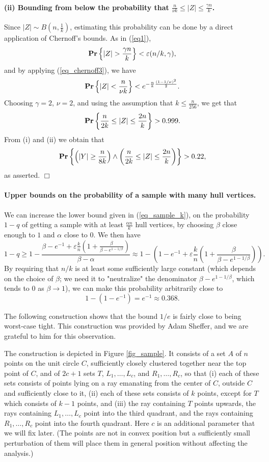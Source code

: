 \documentclass[11pt]{article}
\def\eps{\varepsilon}
\begin{document}
\paragraph{(ii) Bounding from below the probability that $\frac{n}{\nu k} \leq |Z| \leq \frac{\gamma n}{k}$.} Since $|Z| \sim B(n,\frac{1}{k})$, estimating this probability can be done by a direct application of Chernoff's bounds. As in (\ref{eq1}),
$$
{\bf Pr}\left\{|Z| > \frac{\gamma n}{k} \right\} < \eps(n/k,\gamma),
$$
and by applying (\ref{eq_chernoff3}), we have
$$
{\bf Pr}\left\{|Z| < \frac{n}{\nu k} \right\} < e^{-\frac{n}{k}\frac{(1-1/\nu)^{2}}{2}}.
$$
Choosing $\gamma = 2$, $\nu = 2$, and using the assumption that $k \leq \frac{n}{256}$, we get that $$
{\bf Pr}\left\{\frac{n}{2k} \leq |Z| \leq \frac{2n}{k} \right\} > 0.999.
$$
From (i) and (ii) we obtain that
$$
{\bf Pr}\left\{\left(|Y| \geq \frac{n}{8k}\right) \wedge \left(\frac{n}{2k} \leq |Z| \leq \frac{2n}{k} \right) \right\} > 0.22,
$$
as asserted. $\Box$


\paragraph{Upper bounds on the probability of a sample with many hull vertices.}
We can increase the lower bound given in (\ref{eq_sample_k}), on the probability $1-q$ of getting a sample with at least $\frac{\alpha n}{k}$ hull vertices, by choosing $\beta$ close enough to $1$ and $\alpha$ close to $0$. We then have
$$
1-q \geq 1 - \frac{\beta - e^{-1} + \eps\frac{k}{n}\left(1 + \frac{\beta}{\beta - e^{1-1/\beta}}\right)}{\beta-\alpha}
\approx 1 - \left(1 - e^{-1} + \eps\frac{k}{n}\left(1 + \frac{\beta}{\beta - e^{1-1/\beta}}\right)\right).
$$
By requiring that $n/k$ is at least some sufficiently large constant (which depends on the choice of $\beta$; we need it to "neutralize" the denominator $\beta - e^{1-1/\beta}$, which tends to $0$ as $\beta \rightarrow 1$), we can make this probability arbitrarily close to
$$
1 - (1 - e^{-1}) = e^{-1} \approx 0.368.
$$

The following construction shows that the bound $1/e$ is fairly close to being worst-case tight. This construction was provided by Adam Sheffer, and we are grateful to him for this observation.

The construction is depicted in Figure \ref{fig_sample}. It consists of a set $A$ of $n$ points on the unit circle $C$, sufficiently closely clustered together near the top point of $C$, and of $2c+1$ sets $T$, $L_1,\ldots,L_c$, and $R_1,\ldots,R_c$, so that (i) each of these sets consists of points lying on a ray emanating from the center of $C$, outside $C$ and sufficiently close to it, (ii) each of these sets consists of $k$ points, except for $T$ which consists of $k-1$ points, and (iii) the ray containing $T$ points upwards, the rays containing
$L_1,\ldots,L_c$ point into the third quadrant, and the rays containing $R_1,\ldots,R_c$ point into the fourth quadrant. Here $c$ is an additional parameter that we will fix later. (The points are not in convex position but a sufficiently small perturbation of them will place them in general position without affecting the analysis.)
\end{document}
